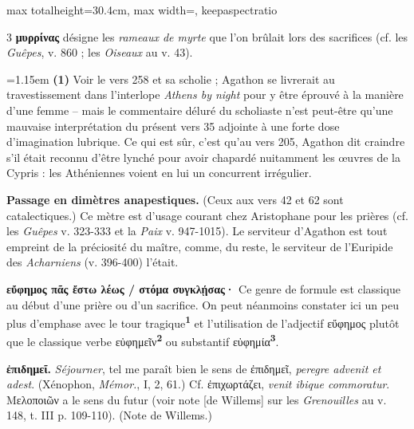 \documentclass[11pt,twoside]{book}
\newcommand{\italique}[1]{\textit{#1}}
\newcommand{\latin}[1]{\textit{#1}}
\newcommand{\marqueur}[1]{\textsuperscript{\color{rubricRed}\textbf{#1}}}
\begin{document}
\begin{adjustbox}{max totalheight=30.4cm, max width=\textwidth, keepaspectratio}
\begin{minipage}{\textwidth}
{\begin{multicols}{3}
 \textbf{μυρρίνας} désigne les \italique{rameaux de myrte} que l'on brûlait lors des sacrifices (cf. les \italique{Guêpes}, v. 860 ; les \italique{Oiseaux} au v. 43).
\par\vspace{1.5pt}
\par\vspace{1.2pt}\par\nopagebreak\vspace{1pt}\noindent\hangindent=1.15em {\color{sepiaNote}\textbf{(1)}} Voir le vers 258 et sa scholie ; Agathon se livrerait au travestissement dans l'interlope \italique{Athens by night} pour y être éprouvé à la manière d'une femme -- mais le commentaire déluré du scholiaste n'est peut-être qu'une mauvaise interprétation du présent vers 35 adjointe à une forte dose d'imagination lubrique. Ce qui est sûr, c'est qu'au vers 205, Agathon dit craindre s'il était reconnu d'être lynché pour avoir chapardé nuitamment les œuvres de la Cypris : les Athéniennes voient en lui un concurrent irrégulier.
\par\vspace{1.5pt}
 \textbf{Passage en dimètres anapestiques.} (Ceux aux vers 42 et 62 sont catalectiques.) Ce mètre est d'usage courant chez Aristophane pour les prières (cf. les \italique{Guêpes} v. 323-333 et la \italique{Paix} v. 947-1015). Le serviteur d'Agathon est tout empreint de la préciosité du maître, comme, du reste, le serviteur de l'Euripide des \italique{Acharniens} (v. 396-400) l'était.
\par\vspace{1.5pt}
 \textbf{εὔφημος πᾶς ἔστω λέως / στόμα συγκλῄσας·} Ce genre de formule est classique au début d'une prière ou d'un sacrifice. On peut néanmoins constater ici un peu plus d'emphase avec le tour tragique\marqueur{1} et l'utilisation de l'adjectif εὔφημος plutôt que le classique verbe εὐφημεῖν\marqueur{2} ou substantif εὐφημία\marqueur{3}.
\par\vspace{1.5pt}
 \textbf{ἐπιδημεῖ.} \italique{Séjourner}, tel me paraît bien le sens de ἐπιδημεῖ, \latin{peregre advenit et adest}. (Xénophon, \italique{Mémor.}, I, 2, 61.) Cf. ἐπιχωρτάζει, \latin{venit ibique commoratur}. Mελοποιῶν a le sens du futur (voir note [de Willems] sur les \italique{Grenouilles} au v. 148, t. III p. 109-110). (Note de Willems.)

\end{multicols}}
\end{minipage}
\end{adjustbox}
\end{document}
